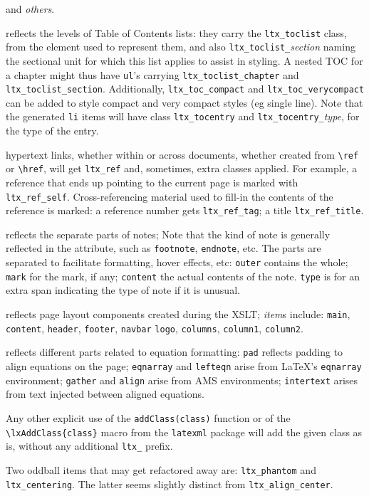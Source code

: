 \documentclass{book}
\begin{document}
\begin{description}
   and \emph{others}.
\item[\texttt{ltx\_toclist\_}\textit{type}, \texttt{ltx\_tocentry\_}\textit{type}]
  reflects the levels of Table of Contents lists:
  they carry the \texttt{ltx\_toclist} class, from the element used to represent them,
  and also \texttt{ltx\_toclist\_}\textit{section} naming the sectional unit for 
  which this list applies to assist in styling.  A nested TOC for a chapter might
  thus have \texttt{ul}'s carrying \texttt{ltx\_toclist\_chapter} and \texttt{ltx\_toclist\_section}.
  Additionally, \texttt{ltx\_toc\_compact} and \texttt{ltx\_toc\_verycompact} can
  be added to style compact and very compact styles (eg single line).
  Note that the generated \texttt{li} items will have class \texttt{ltx\_tocentry}
  and \texttt{ltx\_tocentry\_}\textit{type}, for the type of the entry.
\item[\texttt{ltx\_ref\_}\textit{item}]
  hypertext links, whether within or across documents, whether created from
  \verb|\ref| or \verb|\href|, will get \texttt{ltx\_ref} and, sometimes, extra classes applied.
  For example, a reference that ends up pointing to the current page is
  marked with \texttt{ltx\_ref\_self}.
  Cross-referencing material used to fill-in the contents of the reference is marked:
  a reference number gets \texttt{ltx\_ref\_tag}; a title \texttt{ltx\_ref\_title}.
\item[\texttt{ltx\_note\_}\textit{part}]
  reflects the separate parts of notes;
  Note that the kind of note is generally reflected in the  attribute,
  such as \texttt{footnote}, \texttt{endnote}, etc.
  The parts are separated to facilitate formatting, hover effects, etc:
  \texttt{outer} contains the whole; \texttt{mark} for the mark, if any;
  \texttt{content} the actual contents of the note.
  \texttt{type} is for an extra span indicating the type of note if it is unusual.
\item[\texttt{ltx\_page\_}\textit{item}]
  reflects page layout components created during the XSLT;
  \textit{item}s include:
   \texttt{main}, \texttt{content}, \texttt{header}, \texttt{footer}, \texttt{navbar}
   \texttt{logo}, \texttt{columns}, \texttt{column1}, \texttt{column2}.
\item[\texttt{ltx\_eqn\_}\textit{item}]
  reflects different parts related to equation formatting:
  \texttt{pad} reflects padding to align equations on the page;
  \texttt{eqnarray} and \texttt{lefteqn} arise from \LaTeX's \texttt{eqnarray} environment;
  \texttt{gather} and \texttt{align} arise from AMS environments;
  \texttt{intertext} arises from text injected between aligned equations.
\end{description}

Any other explicit use of the \verb|addClass(class)| function or
of the \verb|\lxAddClass{class}| macro from the \texttt{latexml} package
will add the given class as is, without any additional \texttt{ltx\_} prefix.

Two oddball items that may get refactored away are:
\texttt{ltx\_phantom} and \texttt{ltx\_centering}.
The latter seems slightly distinct from \texttt{ltx\_align\_center}.
\backmatter
\printindex
\end{document}
